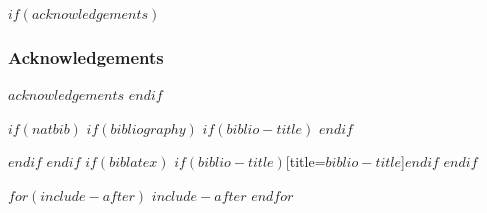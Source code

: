 \documentclass[$els-options$]{elsarticle}
\begin{document}
% 

\newpage
$if(acknowledgements)$
\subsubsection*{Acknowledgements}
{\small $acknowledgements$}
$endif$


$if(natbib)$
$if(bibliography)$
$if(biblio-title)$
\renewcommand\refname{$biblio-title$}
$endif$

$endif$
$endif$
$if(biblatex)$
\printbibliography$if(biblio-title)$[title=$biblio-title$]$endif$
$endif$

$for(include-after)$
$include-after$
$endfor$
\end{document}
